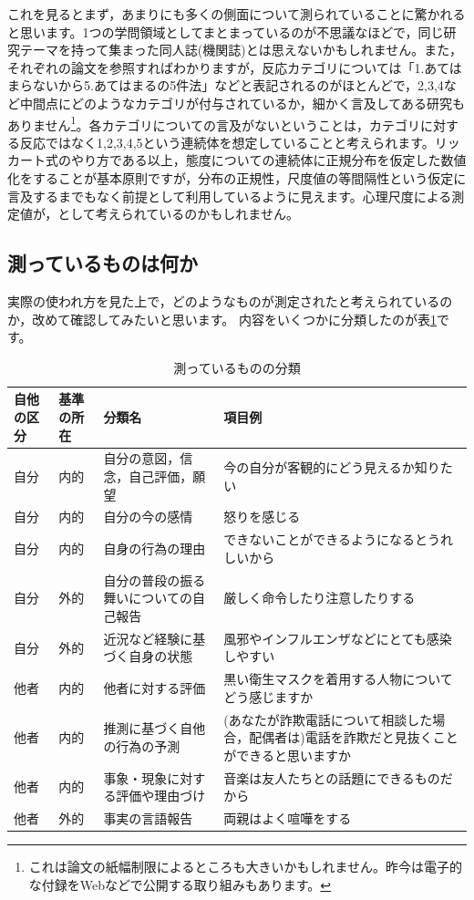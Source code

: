 \documentclass{ltjsbook}
\begin{document}
これを見るとまず，あまりにも多くの側面について測られていることに驚かれると思います。1つの学問領域としてまとまっているのが不思議なほどで，同じ研究テーマを持って集まった同人誌(機関誌)とは思えないかもしれません。また，それぞれの論文を参照すればわかりますが，反応カテゴリについては「1.あてはまらないから5.あてはまるの5件法」などと表記されるのがほとんどで，2,3,4など中間点にどのようなカテゴリが付与されているか，細かく言及してある研究もありません\footnote{これは論文の紙幅制限によるところも大きいかもしれません。昨今は電子的な付録をWebなどで公開する取り組みもあります。}。各カテゴリについての言及がないということは，カテゴリに対する反応ではなく1,2,3,4,5という連続体を想定していることと考えられます。リッカート式のやり方である以上，態度についての連続体に正規分布を仮定した数値化をすることが基本原則ですが，分布の正規性，尺度値の等間隔性という仮定に言及するまでもなく前提として利用しているように見えます。心理尺度による測定値が，として考えられているのかもしれません。

\subsection{測っているものは何か}
実際の使われ方を見た上で，どのようなものが測定されたと考えられているのか，改めて確認してみたいと思います。
内容をいくつかに分類したのが表\ref{tbl:02_02}です。
\begin{table}
	\caption{測っているものの分類}
	\label{tbl:02_02}
	\begin{tabular}{p{1cm}p{1cm}p{4cm}p{6cm}}
		自他の区分 & 基準の所在 & 分類名                 & 項目例                                             \\\hline
		自分    & 内的    & 自分の意図，信念，自己評価，願望    & 今の自分が客観的にどう見えるか知りたい                             \\
		自分    & 内的    & 自分の今の感情             & 怒りを感じる                                          \\
		自分    & 内的    & 自身の行為の理由            & できないことができるようになるとうれしいから                          \\
		自分    & 外的    & 自分の普段の振る舞いについての自己報告 & 厳しく命令したり注意したりする                                 \\
		自分    & 外的    & 近況など経験に基づく自身の状態     & 風邪やインフルエンザなどにとても感染しやすい                          \\
		他者    & 内的    & 他者に対する評価            & 黒い衛生マスクを着用する人物についてどう感じますか                       \\
		他者    & 内的    & 推測に基づく自他の行為の予測      & (あなたが詐欺電話について相談した場合，配偶者は)電話を詐欺だと見抜くことができると思いますか \\
		他者    & 内的    & 事象・現象に対する評価や理由づけ    & 音楽は友人たちとの話題にできるものだから                            \\
		他者    & 外的    & 事実の言語報告             & 両親はよく喧嘩をする                                      \\\hline
	\end{tabular}
\end{table}
\end{document}
